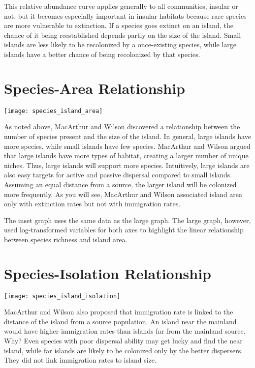 \documentclass[letterpaper]{tufte-handout}
\begin{document}
This relative abundance curve applies generally to all communities, insular or not, but it becomes especially important in insular habitats because rare species are more vulnerable to extinction.  If a species goes extinct on an island, the chance of it being reestablished depends partly on the size of the island.  Small islands are less likely to be recolonized by a once-existing species, while large islands have a better chance of being recolonized by that species.

\section{Species-Area Relationship}

\begin{marginfigure}%
	\centering
	\texttt{[image: species\_island\_area]}
\end{marginfigure} 

As noted above, MacArthur and Wilson discovered a relationship between the number of species present and the size of the island. In general, large islands have more species, while small islands have few species. MacArthur and Wilson argued that large islands have more types of habitat, creating a larger number of unique niches. Thus, large islands will support more species. Intuitively, large islands are also easy targets for active and passive dispersal compared to small islands. Assuming an equal distance from a source, the larger island will be colonized more frequently. As you will see, MacArthur and Wilson associated island area only with extinction rates but not with immigration rates.

The inset graph uses the same data as the large graph. The large graph, however, used log-transformed variables for both axes to highlight the linear relationship between species richness and island area.

\section{Species-Isolation Relationship}
\begin{marginfigure}%
	\centering
	\texttt{[image: species\_island\_isolation]}
\end{marginfigure} 

MacArthur and Wilson also proposed that immigration rate is linked to the distance of the island from a source population.  An island near the mainland would have higher immigration rates than islands far from the mainland source.   Why?  Even species with poor dispersal ability may get lucky and find the near island, while far islands are likely to be colonized only by the better dispersers. They did not link immigration rates to island size. 
\end{document}
